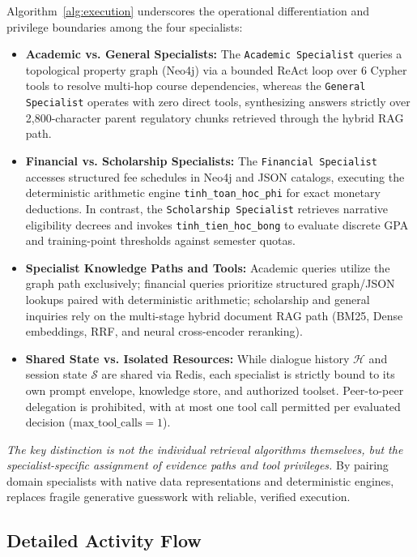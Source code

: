 Algorithm~\ref{alg:execution} underscores the operational differentiation and privilege boundaries among the four specialists:
\begin{itemize}
    \item \textbf{Academic vs. General Specialists:} The \texttt{Academic Specialist} queries a topological property graph (Neo4j) via a bounded ReAct loop over 6 Cypher tools to resolve multi-hop course dependencies, whereas the \texttt{General Specialist} operates with zero direct tools, synthesizing answers strictly over 2,800-character parent regulatory chunks retrieved through the hybrid RAG path.
    \item \textbf{Financial vs. Scholarship Specialists:} The \texttt{Financial Specialist} accesses structured fee schedules in Neo4j and JSON catalogs, executing the deterministic arithmetic engine \texttt{tinh\_toan\_hoc\_phi} for exact monetary deductions. In contrast, the \texttt{Scholarship Specialist} retrieves narrative eligibility decrees and invokes \texttt{tinh\_tien\_hoc\_bong} to evaluate discrete GPA and training-point thresholds against semester quotas.
    \item \textbf{Specialist Knowledge Paths and Tools:} Academic queries utilize the graph path exclusively; financial queries prioritize structured graph/JSON lookups paired with deterministic arithmetic; scholarship and general inquiries rely on the multi-stage hybrid document RAG path (BM25, Dense embeddings, RRF, and neural cross-encoder reranking).
    \item \textbf{Shared State vs. Isolated Resources:} While dialogue history $\mathcal{H}$ and session state $\mathcal{S}$ are shared via Redis, each specialist is strictly bound to its own prompt envelope, knowledge store, and authorized toolset. Peer-to-peer delegation is prohibited, with at most one tool call permitted per evaluated decision ($\text{max\_tool\_calls}=1$).
\end{itemize}
\emph{The key distinction is not the individual retrieval algorithms themselves, but the specialist-specific assignment of evidence paths and tool privileges.} By pairing domain specialists with native data representations and deterministic engines, \system{} replaces fragile generative guesswork with reliable, verified execution.

\subsection{Detailed Activity Flow}
\label{sec:flow}

